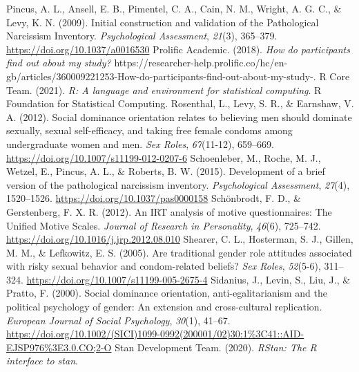 \documentclass[
  donotrepeattitle,doc, 12pt, a4paper,floatsintext]{apa7}
\newlength{\cslhangindent}
\newlength{\cslentryspacingunit} %
\newenvironment{CSLReferences}[2] %
 {%
  \setlength{\parindent}{0pt}
  \ifodd #1
  \let\oldpar\par
  \def\par{\hangindent=\cslhangindent\oldpar}
  \fi
  \setlength{\parskip}{#2\cslentryspacingunit}
 }%
 {}
\begin{document}
\begin{CSLReferences}{1}{0}
\leavevmode{}%
Pincus, A. L., Ansell, E. B., Pimentel, C. A., Cain, N. M., Wright, A. G. C., \& Levy, K. N. (2009). Initial construction and validation of the {Pathological Narcissism Inventory}. \emph{Psychological Assessment}, \emph{21}(3), 365--379. \url{https://doi.org/10.1037/a0016530}
\leavevmode{}%
Prolific Academic. (2018). \emph{How do participants find out about my study?} https://researcher-help.prolific.co/hc/en-gb/articles/360009221253-How-do-participants-find-out-about-my-study-.
\leavevmode{}%
R Core Team. (2021). \emph{R: {A} language and environment for statistical computing}. R Foundation for Statistical Computing.
\leavevmode{}%
Rosenthal, L., Levy, S. R., \& Earnshaw, V. A. (2012). Social dominance orientation relates to believing men should dominate sexually, sexual self-efficacy, and taking free female condoms among undergraduate women and men. \emph{Sex Roles}, \emph{67}(11-12), 659--669. \url{https://doi.org/10.1007/s11199-012-0207-6}
\leavevmode{}%
Schoenleber, M., Roche, M. J., Wetzel, E., Pincus, A. L., \& Roberts, B. W. (2015). Development of a brief version of the pathological narcissism inventory. \emph{Psychological Assessment}, \emph{27}(4), 1520--1526. \url{https://doi.org/10.1037/pas0000158}
\leavevmode{}%
Schönbrodt, F. D., \& Gerstenberg, F. X. R. (2012). An {IRT} analysis of motive questionnaires: {The Unified Motive Scales}. \emph{Journal of Research in Personality}, \emph{46}(6), 725--742. \url{https://doi.org/10.1016/j.jrp.2012.08.010}
\leavevmode{}%
Shearer, C. L., Hosterman, S. J., Gillen, M. M., \& Lefkowitz, E. S. (2005). Are traditional gender role attitudes associated with risky sexual behavior and condom-related beliefs? \emph{Sex Roles}, \emph{52}(5-6), 311--324. \url{https://doi.org/10.1007/s11199-005-2675-4}
\leavevmode{}%
Sidanius, J., Levin, S., Liu, J., \& Pratto, F. (2000). Social dominance orientation, anti-egalitarianism and the political psychology of gender: An extension and cross-cultural replication. \emph{European Journal of Social Psychology}, \emph{30}(1), 41--67. \url{https://doi.org/10.1002/(SICI)1099-0992(200001/02)30:1\%3C41::AID-EJSP976\%3E3.0.CO;2-O}
\leavevmode{}%
Stan Development Team. (2020). \emph{{RStan}: The {R} interface to stan}.

\end{CSLReferences}
\end{document}
